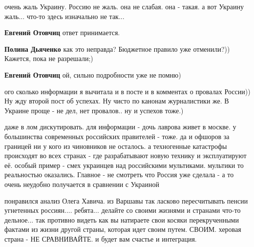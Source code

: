 \begin{itemize}
\begin{itemize}
очень жаль Украину. Россию не жаль. она не слабая. она - такая. а вот Украину жаль... что-то здесь изначально не так...

\textbf{Евгений Отовчиц} ответ принимается.

\textbf{Полина Дьяченко} как это неправда? Бюджетное правило уже отменили?)) Кажется, пока не разрешали;)

\textbf{Евгений Отовчиц} ой, сильно подробности уже не помню)


\end{itemize} %


ого сколько информации я вычитала и в посте и в комментах о провалах России))
Ну жду второй пост об успехах. Ну чисто по канонам журналистики же. В Украине
проще - не дел, нет провалов.. ну и успехов тоже.)


даже в лом дискутировать. для информации - дочь лаврова живет в москве. у
большинства современных российских правителей - тоже. да и офшоров за границей
ни у кого из чиновников не осталось. а техногенные катастрофы происходят во
всех странах - где разрабатывают новую технику и эксплуатируют её. особый
пример - смех украинцев над российскими мультиками. мультики то реальностью
оказались. Главное - не смотреть что Россия уже сделала - а то очень неудобно
получается в сравнении с Украиной



понравился анализ Олега Хавича. из Варшавы так ласково пересчитывать пенсии угнетенных россиян....
ребята... делайте со своими жизнями и странами что-то дельное... так противно
видеть как вы натираете свои косяки перекрученными фактами из жизни другой
страны, которая идет своим путем. СВОИМ. херовая страна - НЕ СРАВНИВАЙТЕ. и
будет вам счастье и интеграция.


\end{itemize} %

